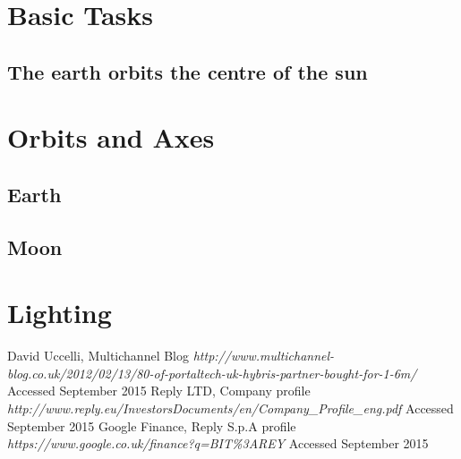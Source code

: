 \documentclass[titlepage]{article}
\begin{document}
\section{Basic Tasks}
\subsection{The earth orbits the centre of the sun}


\section{Orbits and Axes}
\subsection{Earth}
\subsection{Moon}

\section{Lighting}





 \begin{thebibliography}{1}
 	
 	 David Uccelli, Multichannel Blog {\em http://www.multichannel-blog.co.uk/2012/02/13/80-of-portaltech-uk-hybris-partner-bought-for-1-6m/} Accessed September 2015
 	 Reply LTD, Company profile {\em http://www.reply.eu/InvestorsDocuments/en/Company\_Profile\_eng.pdf} Accessed September 2015
 	 Google Finance, Reply S.p.A profile {\em https://www.google.co.uk/finance?q=BIT\%3AREY} Accessed September 2015
 	
 	
 	
 	
 		

	


 \end{thebibliography}
\end{document}
